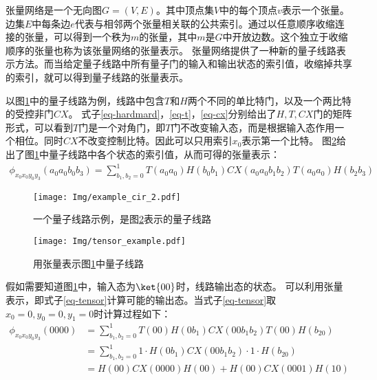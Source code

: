 张量网络是一个无向图\(G=\left(V,E\right)\)。其中顶点集$V$中的每个顶点$v$表示一个张量。边集\(E\)中每条边\(e\)代表与相邻两个张量相关联的公共索引。通过以任意顺序收缩连接的张量，可以得到一个秩为\(m\)的张量，其中\(m\)是$G$中开放边数。这个独立于收缩顺序的张量也称为该张量网络的张量表示\citep{biamonte2019lectures}。
张量网络提供了一种新的量子线路表示方法\citep{pednault2017breaking}。而当给定量子线路中所有量子门的输入和输出状态的索引值，收缩掉共享的索引，就可以得到量子线路的张量表示。
\begin{example}
    \label{ex-tensor}
    以图\ref{fig:example_cir_2}中的量子线路为例，线路中包含$T$和$H$两个不同的单比特门，以及一个两比特的受控非门$CX$。
式子\ref{eq-hardmard}，\ref{eq-t}，\ref{eq-cx}分别给出了$H,T,CX$门的矩阵形式，可以看到$T$门是一个对角门，即$T$门不改变输入态，而是根据输入态作用一个相位。同时$CX$不改变控制比特。因此可以只用索引$x_0$表示第一个比特。
图\ref{fig:example_cir_map}给出了图\ref{fig:example_cir_2}中量子线路中各个状态的索引值，从而可得的张量表示：
\begin{align}
\label{eq-tensor}
\phi_{x_0x_0y_0y_3}\left(a_0a_0b_0b_3\right)=\sum_{b_1,b_2=0}^{1}T\left(a_0a_0\right)H\left(b_0b_1\right)CX\left(a_0a_0b_1b_2\right)T\left(a_0a_0\right)H\left(b_2b_3\right)
    \end{align}
\begin{figure}[!htbp]
    \centering
    \texttt{[image: Img/example\_cir\_2.pdf]}
    \caption{一个量子线路示例，是图\ref{fig:example_cir_map}表示的量子线路}   
    \label{fig:example_cir_2}
\end{figure}
\begin{figure}[!htbp]
    \centering
    \texttt{[image: Img/tensor\_example.pdf]}
    \caption{用张量表示图\ref{fig:example_cir_2}中量子线路}   
    \label{fig:example_cir_map}
\end{figure}
假如需要知道图\ref{fig:example_cir_2}中，输入态为\(\ket{00}\)时，线路输出态的状态。
可以利用张量表示，即式子\ref{eq-tensor}计算可能的输出态。当式子\ref{eq-tensor}取\(x_0 = 0, y_0 = 0, y_1 = 0\)时计算过程如下：
\begin{equation}
    \begin{aligned}
\phi_{x_0x_0y_0y_3}\left(0000\right)&=\sum_{b_1,b_2=0}^{1}T\left(00\right)H\left(0b_1\right)CX\left(00b_1b_2\right)T\left(00\right)H\left(b_20\right)\\ 
    &=\sum_{b_1,b_2=0}^{1}1\cdot H\left(0b_1\right)CX\left(00b_1b_2\right)\cdot 1\cdot H\left(b_20\right)\\
        &=H\left(00\right)CX\left(0000\right)H\left(00\right)+H\left(00\right)CX\left(0001\right)H\left(10\right)\\

\end{aligned}
\end{equation}
\end{example}
